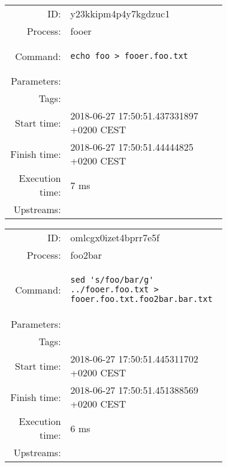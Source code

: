 \documentclass[11pt,twoside,openright]{memoir}
\begin{document}

    \begin{tcolorbox}[title=fooer]
        \small
        \begin{tabular}{rp{0.72\linewidth}}
ID: & y23kkipm4p4y7kgdzuc1 \\
Process: & fooer \\
Command: & \begin{lstlisting}
echo foo > fooer.foo.txt
\end{lstlisting} \\
Parameters:& \\
Tags: & \\
Start time: & 2018-06-27 17:50:51.437331897 +0200 CEST \\
Finish time: & 2018-06-27 17:50:51.44444825 +0200 CEST \\
Execution time: & 7 ms \\
Upstreams: & \\
        \end{tabular}
    \end{tcolorbox}

    \begin{tcolorbox}[title=foo2bar]
        \small
        \begin{tabular}{rp{0.72\linewidth}}
ID: & omlcgx0izet4bprr7e5f \\
Process: & foo2bar \\
Command: & \begin{lstlisting}
sed 's/foo/bar/g' ../fooer.foo.txt > fooer.foo.txt.foo2bar.bar.txt
\end{lstlisting} \\
Parameters:& \\
Tags: & \\
Start time: & 2018-06-27 17:50:51.445311702 +0200 CEST \\
Finish time: & 2018-06-27 17:50:51.451388569 +0200 CEST \\
Execution time: & 6 ms \\
Upstreams: & \\
        \end{tabular}
    \end{tcolorbox}
\end{document}
